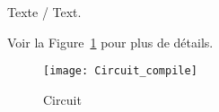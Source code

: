 \label{sec:RevLitt}
Texte / Text.

Voir la Figure~\ref{fig:Circuit} pour plus de détails. 

\begin{figure}[htb]
\centering
\texttt{[image: Circuit\_compile]}
\caption{Circuit}
\label{fig:Circuit}
\end{figure}